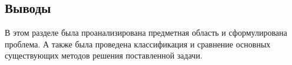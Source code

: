 
\subsection*{Выводы}

В этом разделе была проанализирована предметная область и сформулирована проблема. А также была проведена классификация и сравнение основных существующих методов решения поставленной задачи.


